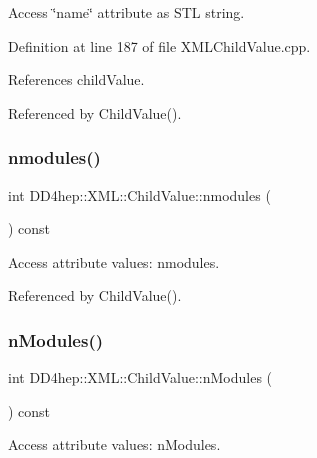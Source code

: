 Access \char`\"{}name\char`\"{} attribute as S\+TL string. 



Definition at line 187 of file X\+M\+L\+Child\+Value.\+cpp.



References child\+Value.



Referenced by Child\+Value().

\hypertarget{struct_d_d4hep_1_1_x_m_l_1_1_child_value_af80204c30405dce5f703c63b9f6f4e0a}{}\label{struct_d_d4hep_1_1_x_m_l_1_1_child_value_af80204c30405dce5f703c63b9f6f4e0a} 
\subsubsection{\texorpdfstring{nmodules()}{nmodules()}}
{\footnotesize\ttfamily int D\+D4hep\+::\+X\+M\+L\+::\+Child\+Value\+::nmodules (\begin{DoxyParamCaption}{ }\end{DoxyParamCaption}) const}



Access attribute values\+: nmodules. 



Referenced by Child\+Value().

\hypertarget{struct_d_d4hep_1_1_x_m_l_1_1_child_value_a40b7972cfaea665fcd7dbd6f559006ba}{}\label{struct_d_d4hep_1_1_x_m_l_1_1_child_value_a40b7972cfaea665fcd7dbd6f559006ba} 
\subsubsection{\texorpdfstring{n\+Modules()}{nModules()}}
{\footnotesize\ttfamily int D\+D4hep\+::\+X\+M\+L\+::\+Child\+Value\+::n\+Modules (\begin{DoxyParamCaption}{ }\end{DoxyParamCaption}) const}



Access attribute values\+: n\+Modules. 



